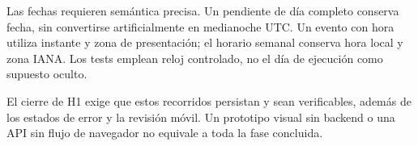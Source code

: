 Las fechas requieren semántica precisa. Un pendiente de día completo conserva fecha, sin convertirse artificialmente en medianoche UTC. Un evento con hora utiliza instante y zona de presentación; el horario semanal conserva hora local y zona IANA. Los tests emplean reloj controlado, no el día de ejecución como supuesto oculto.


El cierre de H1 exige que estos recorridos persistan y sean verificables, además de los estados de error y la revisión móvil. Un prototipo visual sin backend o una API sin flujo de navegador no equivale a toda la fase concluida.
